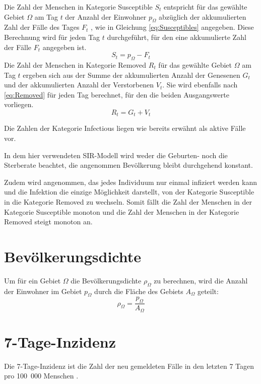 Die Zahl der Menschen in Kategorie \glqq{}Susceptible\grqq{} $S_t$ entspricht für das gewählte Gebiet $\Omega$ am Tag $t$ der Anzahl der Einwohner $p_{\Omega}$ abzüglich der akkumulierten Zahl der Fälle des Tages $F_t$ , wie in Gleichung \autoref{eq:Susceptibles} angegeben. Diese Berechnung wird für jeden Tag $t$ durchgeführt, für den eine akkumulierte Zahl der Fälle $F_t$ angegeben ist.
    \begin{equation}\label{eq:Susceptibles}
        S_t=p_{\Omega}-F_t
    \end{equation}
Die Zahl der Menschen in Kategorie \glqq{}Removed\grqq{} $R_t$ für das gewählte Gebiet $\Omega$ am Tag $t$ ergeben sich aus der Summe der akkumulierten Anzahl der Genesenen $G_t$ und der akkumulierten Anzahl der Verstorbenen $V_t$. Sie wird ebenfalls nach \autoref{eq:Removed} für jeden Tag berechnet, für den die beiden Ausgangswerte vorliegen.
\begin{equation}\label{eq:Removed}
    R_t=G_t+V_t
\end{equation}

Die Zahlen der Kategorie \glqq{}Infectious\grqq{} liegen wie bereits erwähnt als aktive Fälle vor.

In dem hier verwendeten SIR-Modell wird weder die Geburten- noch die Sterberate beachtet, die angenommen Bevölkerung bleibt durchgehend konstant.

Zudem wird angenommen, das jedes Individuum nur einmal infiziert werden kann und die Infektion die einzige Möglichkeit darstellt, von der Kategorie \glqq{}Susceptible\grqq{} in die Kategorie \glqq{}Removed\grqq{} zu wechseln.
Somit fällt die Zahl der Menschen in der Kategorie \glqq{}Susceptible\grqq{} monoton und die Zahl der Menschen in der Kategorie \glqq{}Removed\grqq{} steigt monoton an.\autocite{SIR}

\section{Bevölkerungsdichte}
Um für ein Gebiet $\Omega$ die Bevölkerungsdichte $\rho_{\Omega}$ zu berechnen, wird die Anzahl der Einwohner im Gebiet $p_{\Omega}$ durch die Fläche des Gebiets $A_{\Omega}$ geteilt:
\begin{equation}\label{eq:Bevölkerungsdichte}
    \rho_{\Omega} = \frac{p_{\Omega}}{A_{\Omega}}
\end{equation}
\section{7-Tage-Inzidenz}\label{sec:Grundlagen:7-Tages Inzidenz}
Die 7-Tage-Inzidenz ist die Zahl der neu gemeldeten Fälle in den letzten 7 Tagen pro 100~000 Menschen \autocite{7-TageInzidenz}.


